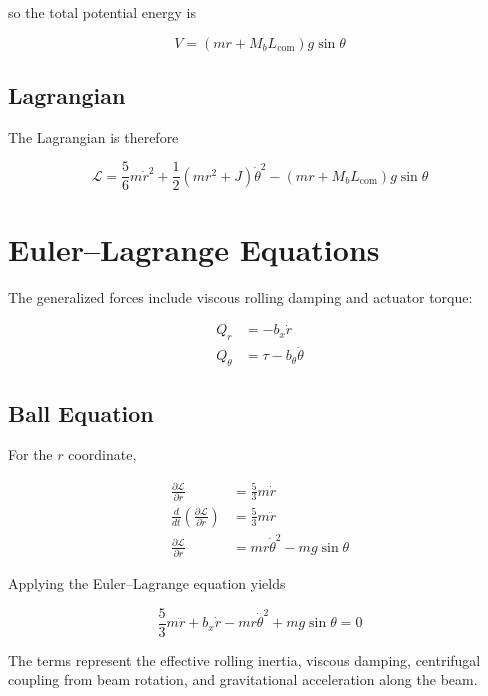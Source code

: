so the total potential energy is

\begin{equation}
  V = (mr + M_bL_{\text{com}}) g \sin\theta
\end{equation}

\subsection{Lagrangian}

The Lagrangian is therefore

\begin{equation}
  \mathcal{L}
  = \frac{5}{6}m\dot{r}^2
  + \frac{1}{2}\left(mr^2 + J\right)\dot{\theta}^2
  - (mr + M_bL_{\text{com}}) g \sin\theta
\end{equation}

\section{Euler--Lagrange Equations}

The generalized forces include viscous rolling damping and actuator torque:

\begin{align}
  Q_r &= -b_x \dot{r} \\
  Q_{\theta} &= \tau - b_{\theta}\dot{\theta}
\end{align}

\subsection{Ball Equation}

For the $r$ coordinate,

\begin{align}
  \frac{\partial \mathcal{L}}{\partial \dot{r}} &= \frac{5}{3}m\dot{r} \\
  \frac{d}{dt}\left(\frac{\partial \mathcal{L}}{\partial \dot{r}}\right) &= \frac{5}{3}m\ddot{r} \\
  \frac{\partial \mathcal{L}}{\partial r} &= mr\dot{\theta}^2 - mg\sin\theta
\end{align}

Applying the Euler--Lagrange equation yields

\begin{equation}
  \frac{5}{3}m\ddot{r} + b_x\dot{r} - mr\dot{\theta}^2 + mg\sin\theta = 0
  \label{eq:eom_r}
\end{equation}

The terms represent the effective rolling inertia, viscous damping, centrifugal
coupling from beam rotation, and gravitational acceleration along the beam.

